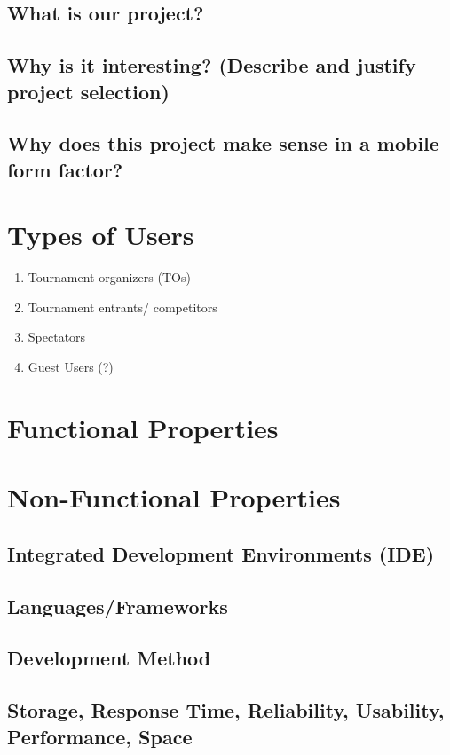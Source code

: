 \documentclass{article}
\begin{document}
\subsection*{What is our project? }
\subsection*{Why is it interesting? (Describe and justify project selection)}
\subsection*{Why does this project make sense in a mobile form factor?}

\section*{Types of Users}
\begin{enumerate}
    \item{Tournament organizers (TOs)}
    \item{Tournament entrants/ competitors}
    \item{Spectators}
    \item{Guest Users (?)}
\end{enumerate}

\section*{Functional Properties}
\section*{Non-Functional Properties}

\subsection*{Integrated Development Environments (IDE)}
\subsection*{Languages/Frameworks}
\subsection*{Development Method}
\subsection*{Storage, Response Time, Reliability, Usability, Performance, Space}
\end{document}
